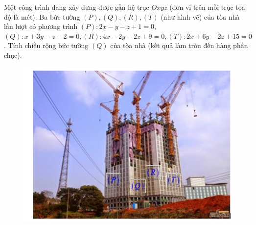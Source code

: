 \begin{ex}%
	Một công trình đang xây dựng được gắn hệ trục $O x y z$ (đơn vị trên mỗi trục tọa độ là mét). Ba bức tường $(P),(Q),(R),(T)$ (như hình vẽ) của tòa nhà lần lượt có phương trình $(P)\colon 2x-y-z+1=0$, $(Q)\colon x+3y-z-2=0,(R)\colon 4x-2y-2 z+9=0,(T)\colon 2x+6y-2z+15=0$. Tính chiều rộng bức tường $(Q)$ của tòa nhà (kết quả làm tròn đến hàng phần chục).
	\begin{figure}[!ht]
		\centering
		\includegraphics[width=0.5\linewidth]{image/h2.png}
	\end{figure}
\end{ex}
